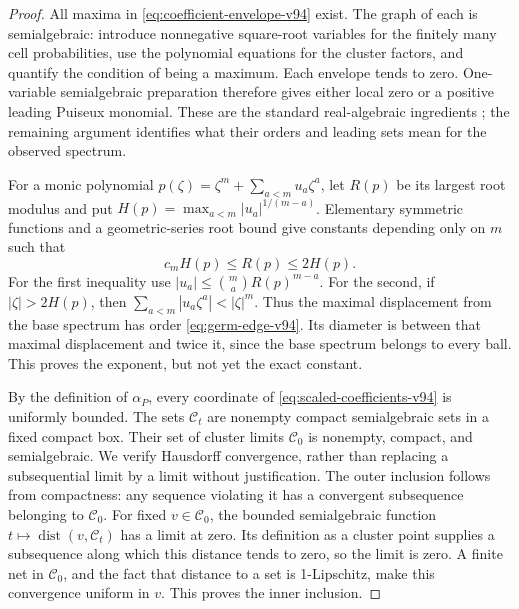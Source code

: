 \begin{proof}
All maxima in \eqref{eq:coefficient-envelope-v94} exist. The graph
of each is semialgebraic: introduce nonnegative square-root variables
for the finitely many cell probabilities, use the polynomial equations
for the cluster factors, and quantify the condition of being a maximum.
Each envelope tends to zero. One-variable semialgebraic preparation
therefore gives either local zero or a positive leading Puiseux
monomial. These are the standard real-algebraic ingredients
\cite{BCR98,BPR06}; the remaining argument identifies what their
orders and leading sets mean for the observed spectrum.

For a monic polynomial $p(\zeta)=\zeta^m+\sum_{a<m}u_a\zeta^a$,
let $R(p)$ be its largest root modulus and put
$H(p)=\max_{a<m}|u_a|^{1/(m-a)}$. Elementary symmetric functions
and a geometric-series root bound give constants depending only on
$m$ such that
\begin{equation}\label{eq:root-coeff-comparison-v94}
 c_m H(p)\le R(p)\le2H(p).
\end{equation}
For the first inequality use
$|u_a|\le\binom ma R(p)^{m-a}$. For the second, if
$|\zeta|>2H(p)$, then
$\sum_{a<m}|u_a\zeta^a|<|\zeta|^m$.
Thus the maximal displacement from the base spectrum has order
\eqref{eq:germ-edge-v94}. Its diameter is between that maximal
displacement and twice it, since the base spectrum belongs to every
ball. This proves the exponent, but not yet the exact constant.

By the definition of $\alpha_P$, every coordinate of
\eqref{eq:scaled-coefficients-v94} is uniformly bounded. The sets
$\mathcal C_t$ are nonempty compact semialgebraic sets in a fixed
compact box. Their set of cluster limits $\mathcal C_0$ is nonempty,
compact, and semialgebraic. We verify Hausdorff convergence, rather
than replacing a subsequential limit by a limit without justification.
The outer inclusion follows from compactness: any sequence violating
it has a convergent subsequence belonging to $\mathcal C_0$.
For fixed $v\in\mathcal C_0$, the bounded semialgebraic function
$t\mapsto\operatorname{dist}(v,\mathcal C_t)$ has a limit at zero.
Its definition as a cluster point supplies a subsequence along which
this distance tends to zero, so the limit is zero. A finite net in
$\mathcal C_0$, and the fact that distance to a set is 1-Lipschitz,
make this convergence uniform in $v$. This proves the inner inclusion.


\end{proof}
